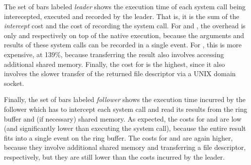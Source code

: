 The set of bars labeled \textit{leader} shows the execution time of each
system call being interecepted, executed and recorded by the leader.
That is, it is the sum of the \textit{intercept} cost and the
cost of recording the system call.  For  and ,
the overhead is only \closeLeaderOvh and \writeLeaderOvh respectively on top of
the native execution, because the arguments and results of these system calls
can be recorded in a single event.  For , this is more expensive, at
139\%, because transferring the result also involves accessing additional
shared memory.  Finally, the cost for  is the highest, since it also
involves the slower transfer of the returned file descriptor via a UNIX domain
socket.

Finally, the set of bars labeled \textit{follower} shows the execution time
incurred by the follower which has to intercept each system call and read its
results from the ring buffer and (if necessary) shared memory.  As expected, the
costs for  and  are low (and significantly lower
than executing the system call), because the entire result fits into a
single event on the ring buffer. The costs for  and
 are again higher, because they involve additional shared
memory and transferring a file descriptor, respectively, but they are
still lower than the costs incurred by the leader.




